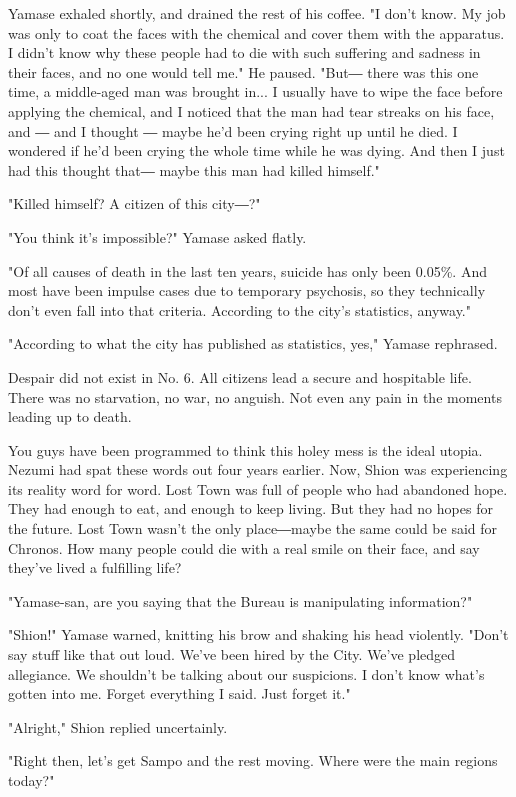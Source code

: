 Yamase exhaled shortly, and drained the rest of his coffee. "I don't
know. My job was only to coat the faces with the chemical and cover them
with the apparatus. I didn't know why these people had to die with such
suffering and sadness in their faces, and no one would tell me." He
paused. "But― there was this one time, a middle-aged man was brought
in... I usually have to wipe the face before applying the chemical, and
I noticed that the man had tear streaks on his face, and ― and I thought
― maybe he'd been crying right up until he died. I wondered if he'd been
crying the whole time while he was dying. And then I just had this
thought that― maybe this man had killed himself."

"Killed himself? A citizen of this city―?"

"You think it's impossible?" Yamase asked flatly.

"Of all causes of death in the last ten years, suicide has only been
0.05\%. And most have been impulse cases due to temporary psychosis, so
they technically don't even fall into that criteria. According to the
city's statistics, anyway."

"According to what the city has published as statistics, yes," Yamase
rephrased.

Despair did not exist in No. 6. All citizens lead a secure and
hospitable life. There was no starvation, no war, no anguish. Not even
any pain in the moments leading up to death.

You guys have been programmed to think this holey mess is the ideal
utopia. Nezumi had spat these words out four years earlier. Now, Shion
was experiencing its reality word for word. Lost Town was full of people
who had abandoned hope. They had enough to eat, and enough to keep
living. But they had no hopes for the future. Lost Town wasn't the only
place―maybe the same could be said for Chronos. How many people could
die with a real smile on their face, and say they've lived a fulfilling
life?

"Yamase-san, are you saying that the Bureau is manipulating
information?"

"Shion!" Yamase warned, knitting his brow and shaking his head
violently. "Don't say stuff like that out loud. We've been hired by the
City. We've pledged allegiance. We shouldn't be talking about our
suspicions. I don't know what's gotten into me. Forget everything I
said. Just forget it."

"Alright," Shion replied uncertainly.

"Right then, let's get Sampo and the rest moving. Where were the main
regions today?"

